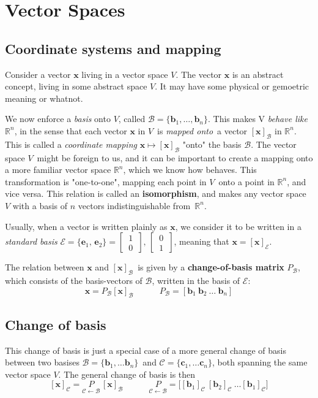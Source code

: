 \documentclass[12p,a4paper]{report}
\renewcommand{\b}{\boldsymbol}
\newcommand{\m}{\mathbb}
\begin{document}
\setcounter{chapter}{3}
\chapter{Vector Spaces}
\section{Coordinate systems and mapping}
Consider a vector $\b x$ living in a vector space $V$. The vector $\b x$ is an abstract concept, living in some abstract space $V$. It may have some physical or gemoetric meaning or whatnot.

We now enforce a \textit{basis} onto $V$, called $\mathcal{B} = \{\b b_1,\dots, \b b_n\}$. This makes V \textit{behave like} $\m R^n$, in the sense that each vector $\b x$ in $V$ is \textit{mapped onto} a vector $[\b x]_\mathcal{B}$ in $\m R^n$. This is called a \textit{coordinate mapping} $\b x \mapsto [\b x]_\mathcal{B}$ "onto" the basis $\mathcal{B}$. The vector space $V$ might be foreign to us, and it can be important to create a mapping onto a more familiar vector space $\m R^n$, which we know how behaves. This transformation is "one-to-one", mapping each point in $V$ onto a point in $\m R^n$, and vice versa. This relation is called an \textbf{isomorphism}, and makes any vector space $V$ with a basis of $n$ vectors indistinguishable from $\m R^n$.

Usually, when a vector is written plainly as $\b x$, we consider it to be written in a \textit{standard basis} $\mathcal{E} = \{\b e_1,\, \b e_2\} = \begin{bmatrix} \,1\, \\ \,0\, \end{bmatrix},\, \begin{bmatrix} \,0\, \\ \,1\, \end{bmatrix}$, meaning that $\b x = [\b x]_\mathcal{E}$.

The relation between $\b x$ and $[\b x]_\mathcal{B}$ is given by a \textbf{change-of-basis matrix} $P_\mathcal{B}$, which consists of the basis-vectors of $\mathcal{B}$, written in the basis of $\mathcal{E}$:
\[
    \b x = P_\mathcal{B}[\b x]_\mathcal{B}  \quad\quad\quad  P_\mathcal{B} = [\b b_1\ \b b_2\ \dots\ \b b_n]
\]


\section{Change of basis}
This change of basis is just a special case of a more general change of basis between two basises $\mathcal{B} = \{\b b_1, \dots \b b_n\}$ and $\mathcal{C} = \{\b c_1, \dots \b c_n\}$, both spanning the same vector space $V$. The general change of basis is then
\[
    [\b x]_\mathcal{C} = \underset{\mathcal{C}\leftarrow\mathcal{B}}{P}\,[\b x]_\mathcal{B} \quad\quad\quad
    \underset{\mathcal{C}\leftarrow\mathcal{B}}{P} = \Big[[\b b_1]_\mathcal{C}\ [\b b_2]_\mathcal{C}\ \dots [\b b_1]_\mathcal{C}\Big]
\]
\end{document}
